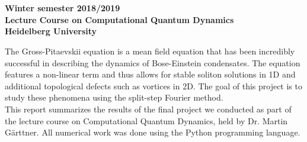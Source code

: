 \begin{center}

	\makeatletter
	\thispagestyle{plain}
	\LARGE\textbf{\@title} \\
	\vspace{2mm}
	\large\bfseries{\@author} \\
	\normalfont
	\vspace{2mm}
	\large{Winter semester 2018/2019} \\
	\vspace{2mm}
	\large{Lecture Course on Computational Quantum Dynamics \\
		Heidelberg University} \\
	\makeatother
\end{center}

\normalsize

The Gross-Pitaevskii equation is a mean field equation that has been incredibly successful in describing the dynamics of Bose-Einstein condensates. The equation features a non-linear term and thus allows for stable soliton solutions in 1D and additional topological defects such as vortices in 2D. The goal of this project is to study these phenomena using the split-step Fourier method. \\

This report summarizes the results of the final project we conducted as part of the lecture course on Computational Quantum Dynamics, held by Dr. Martin G\"arttner. All numerical work was done using the Python programming language. 

